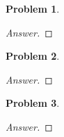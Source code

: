 \documentclass{article}
\newtheorem{problem}{Problem}[section]
\begin{document}
\begin{problem}
    
\end{problem}

\begin{proof}[Answer]
    
\end{proof}


\begin{problem}
    
\end{problem}

\begin{proof}[Answer]
    
\end{proof}


\begin{problem}
    
\end{problem}

\begin{proof}[Answer]
    
\end{proof}
\end{document}
